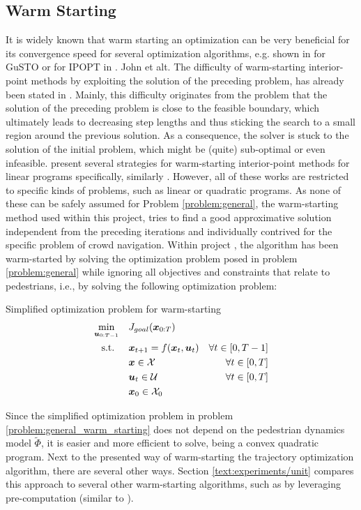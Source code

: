 \subsection{Warm Starting}
\label{text:approach/runtime/warm_starting}
It is widely known that warm starting an optimization can be very beneficial for its convergence speed for several optimization algorithms, e.g. shown in \cite{Banerjee2020} for \ac{GuSTO} or for \ac{IPOPT} in \cite{Spielberg2019}. John et alt. The difficulty of warm-starting interior-point methods by exploiting the solution of the preceding problem, has already been stated in \cite{Wright1997}\cite{Gondzio2008}. Mainly, this difficulty originates from the problem that the solution of the preceding problem is close to the feasible boundary, which ultimately leads to decreasing step lengths and thus sticking the search to a small region around the previous solution. As a consequence, the solver is stuck to the solution of the initial problem, which might be (quite) sub-optimal or even infeasible. \cite{John2008} present several strategies for warm-starting interior-point methods for linear programs specifically, similarly \cite{Shahzad2010}\cite{Gondzio2008}. However, all of these works are restricted to specific kinds of problems, such as linear or quadratic programs. As none of these can be safely assumed for Problem \ref{problem:general}, the warm-starting method used within this project, tries to find a good approximative solution independent from the preceding iterations and individually contrived for the specific problem of crowd navigation.
\newline
Within project \project, the algorithm has been warm-started by solving the optimization problem posed in problem \ref{problem:general} while ignoring all objectives and constraints that relate to pedestrians, i.e., by solving the following optimization problem: \\

\begin{problem}{Simplified optimization problem for warm-starting}
\begin{align}
\min_{\boldsymbol{u}_{0:T-1}} \quad & J_{goal}(\boldsymbol{x}_{0:T}) \\
\textrm{s.t. } \quad & \boldsymbol{x}_{t+1} = f(\boldsymbol{x}_t, \boldsymbol{u}_t) & \forall t \in [0, T - 1] \\
& \boldsymbol{x} \in \mathcal{X} & \forall t \in [0, T]\\
& \boldsymbol{u}_t \in \mathcal{U} & \forall t \in [0, T]\\
& \boldsymbol{x}_0 \in \mathcal{X}_0
\end{align}
\label{problem:general_warm_starting}
\end{problem}

Since the simplified optimization problem in problem \ref{problem:general_warm_starting} does not depend on the pedestrian dynamics model $\tilde{\Phi}$, it is easier and more efficient to solve, being a convex quadratic program. Next to the presented way of warm-starting the trajectory optimization algorithm, there are several other ways. Section \ref{text:experiments/unit} compares this approach to several other warm-starting algorithms, such as by leveraging pre-computation (similar to \cite{Merkt2018}).